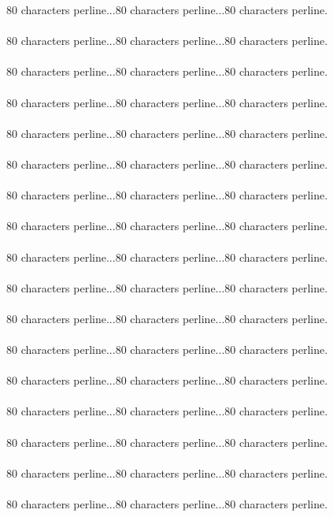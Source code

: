 {{{{80 characters perline...80 characters perline...80 characters perline.\asdf\\\\
80 characters perline...80 characters perline...80 characters perline.\asdf\\\\
80 characters perline...80 characters perline...80 characters perline.\asdf\\\\
80 characters perline...80 characters perline...80 characters perline.\asdf\\\\
80 characters perline...80 characters perline...80 characters perline.\asdf\\\\
80 characters perline...80 characters perline...80 characters perline.\asdf\\\\
80 characters perline...80 characters perline...80 characters perline.\asdf\\\\
80 characters perline...80 characters perline...80 characters perline.\asdf\\\\
80 characters perline...80 characters perline...80 characters perline.\asdf\\\\
80 characters perline...80 characters perline...80 characters perline.\asdf\\\\
80 characters perline...80 characters perline...80 characters perline.\asdf\\\\
80 characters perline...80 characters perline...80 characters perline.\asdf\\\\
80 characters perline...80 characters perline...80 characters perline.\asdf\\\\
80 characters perline...80 characters perline...80 characters perline.\asdf\\\\
80 characters perline...80 characters perline...80 characters perline.\asdf\\\\
80 characters perline...80 characters perline...80 characters perline.\asdf\\\\
80 characters perline...80 characters perline...80 characters perline.\asdf\\\\
}}}}
